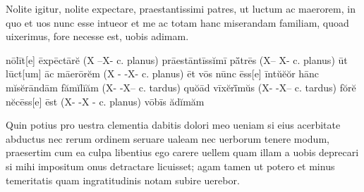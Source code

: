 \documentclass[a5paper,twoside]{article}
\begin{document}
Nolite igitur, nolite expectare, 
praestantissimi patres, 
	ut luctum ac maerorem, 
		in quo et uos nunc esse intueor 
		et me ac totam hanc miserandam familiam, 
			quoad uixerimus, 
				fore necesse est, 
	uobis adimam. 

nōlīt[e] ēxpēctārĕ (X --X- c. planus)
prāestāntīssĭmī pā̆trēs (X-- X- c. planus)
ūt lūct[um] āc māerōrĕm (X - -X- c. planus)
ēt vōs nūnc ēss[e] īntŭĕŏr
hānc mĭsĕrāndām fămĭlĭăm (X- -X-- c. tardus)
quŏād vīxĕrī̆mŭs (X- -X-- c. tardus)
fŏrĕ nĕcēss[e] ēst (X- -X - c. planus)
vōbīs ădĭmăm

Quin potius pro uestra clementia dabitis dolori meo ueniam si eius acerbitate abductus nec rerum ordinem seruare ualeam nec uerborum tenere modum, praesertim cum ea culpa libentius ego carere uellem quam illam a uobis deprecari si mihi impositum onus detractare licuisset; agam tamen ut potero et minus temeritatis quam ingratitudinis notam subire uerebor.
\end{document}
